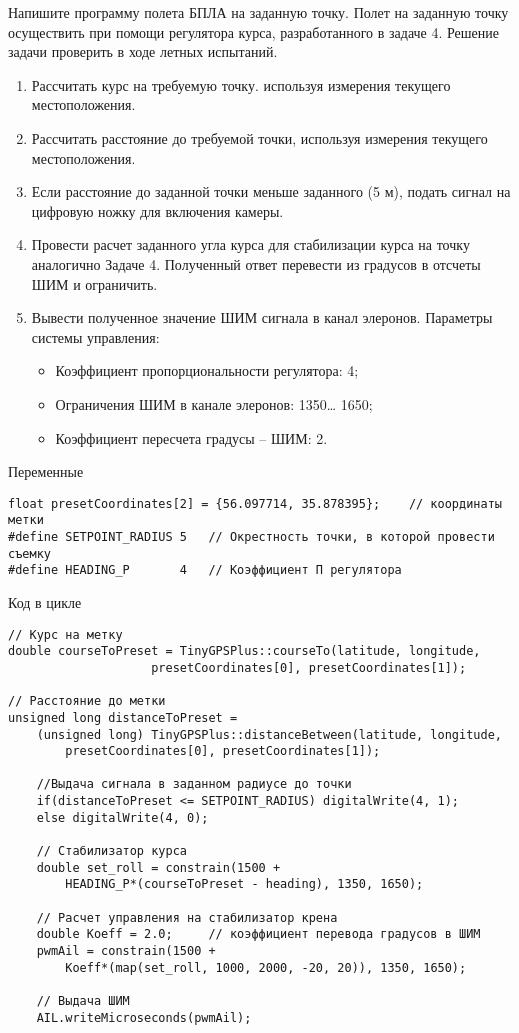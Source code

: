 
Напишите программу полета БПЛА на заданную точку. Полет на заданную точку осуществить при помощи регулятора курса, разработанного в задаче 4. Решение задачи проверить в ходе летных испытаний.

\solutionSection
\begin{enumerate}
    \item Рассчитать курс на требуемую точку. используя измерения текущего местоположения.     
    \item  Рассчитать расстояние до требуемой точки, используя измерения текущего местоположения.
    \item  Если расстояние до заданной точки меньше заданного (5 м), подать сигнал на цифровую ножку для включения камеры.
    \item  Провести расчет заданного угла курса для стабилизации курса на точку аналогично Задаче 4. Полученный ответ перевести из градусов в отсчеты ШИМ и ограничить.
    \item Вывести полученное значение ШИМ сигнала в канал элеронов. 
    Параметры системы управления:
    \begin{itemize}
        \item	Коэффициент пропорциональности регулятора: 4;
        \item	Ограничения ШИМ в канале элеронов: 1350… 1650;
        \item	Коэффициент пересчета градусы – ШИМ: 2.
    \end{itemize}
\end{enumerate}
Переменные
\begin{verbatim}
float presetCoordinates[2] = {56.097714, 35.878395};	// координаты метки
#define SETPOINT_RADIUS 5	// Окрестность точки, в которой провести съемку
#define HEADING_P       4	// Коэффициент П регулятора
\end{verbatim}
Код в цикле
\begin{verbatim}
// Курс на метку
double courseToPreset = TinyGPSPlus::courseTo(latitude, longitude, 
					presetCoordinates[0], presetCoordinates[1]);

// Расстояние до метки
unsigned long distanceToPreset = 
	(unsigned long) TinyGPSPlus::distanceBetween(latitude, longitude, 
		presetCoordinates[0], presetCoordinates[1]);
		
	//Выдача сигнала в заданном радиусе до точки
	if(distanceToPreset <= SETPOINT_RADIUS) digitalWrite(4, 1);
	else digitalWrite(4, 0);

	// Стабилизатор курса
	double set_roll = constrain(1500 + 
		HEADING_P*(courseToPreset - heading), 1350, 1650);

	// Расчет управления на стабилизатор крена
	double Koeff = 2.0;		// коэффициент перевода градусов в ШИМ
	pwmAil = constrain(1500 + 
		Koeff*(map(set_roll, 1000, 2000, -20, 20)), 1350, 1650);

	// Выдача ШИМ
	AIL.writeMicroseconds(pwmAil);

\end{verbatim}

